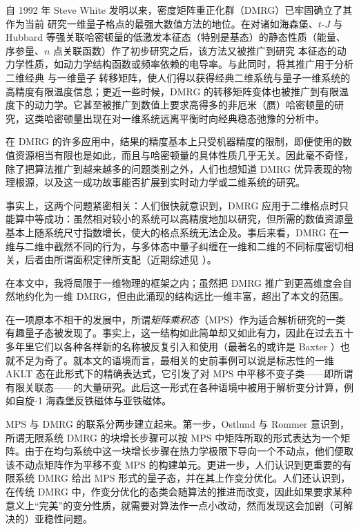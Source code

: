 \documentclass[a4paper,10pt,oneside,onecolumn,1p,times]{elsarticle}
\begin{document}
自 1992 年 Steve White 发明以来\cite{White92,White93}，密度矩阵重正化群（DMRG）已牢固确立了其作为当前
研究一维量子格点的最强大数值方法的地位\cite{Schollwoeck05,Hallberg06}。在对诸如海森堡、$t$-$J$ 与 Hubbard 等强关联哈密顿量的低激发本征态（特别是基态）的静态性质（能量、序参量、$n$ 点关联函数）作了初步研究之后，该方法又被推广到研究
本征态的动力学性质，如动力学结构函数或频率依赖的电导率\cite{Hallberg95,Ramasesha97,Kuhner99,Jeckelmann02}。与此同时，将其推广用于分析二维经典 \cite{Nishino95} 与一维量子 \cite{Wang97,Shibata97} 转移矩阵，使人们得以获得经典二维系统与量子一维系统的高精度有限温度信息；更近一些时候，DMRG 的转移矩阵变体也被推广到有限温度下的动力学\cite{Sirker05}。它甚至被推广到数值上要求高得多的非厄米（赝）哈密顿量的研究，这类哈密顿量出现在对一维系统远离平衡时向经典稳态弛豫的分析中\cite{Hieida98,Carlon99,Carlon01,Henkel01}。 

在 DMRG 的许多应用中，结果的精度基本上只受机器精度的限制，即便使用的数值资源相当有限也是如此，而且与哈密顿量的具体性质几乎无关。因此毫不奇怪，除了把算法推广到越来越多的问题类别之外，人们也想知道 DMRG 优异表现的物理根源，以及这一成功故事能否扩展到实时动力学或二维系统的研究。 

事实上，这两个问题紧密相关：人们很快就意识到，DMRG 应用于二维格点时只能算中等成功：虽然相对较小的系统可以高精度地加以研究\cite{White96,White98a,White98b,White00,White03,Chernyshev03,Chernyshev05,White07}，但所需的数值资源量基本上随系统尺寸指数增长，使大的格点系统无法企及。事后来看，DMRG 在一维与二维中截然不同的行为，与多体态中量子纠缠在一维和二维的不同标度密切相关\cite{Vidal03,Latorre04}，后者由所谓面积定律所支配（近期综述见 \cite{Eisert10}）。 

在本文中，我将局限于一维物理的框架之内；虽然把 DMRG 推广到更高维度会自然地约化为一维 DMRG，但由此涌现的结构远比一维丰富，超出了本文的范围。  
  
在一项原本不相干的发展中，所谓{\em 矩阵乘积态}（MPS）作为适合解析研究的一类有趣量子态被发现了。事实上，这一结构如此简单却又如此有力，因此在过去五十多年里它们以各种各样新的名称被反复引入和使用（最著名的或许是 Baxter \cite{Baxter68}）也就不足为奇了。就本文的语境而言，最相关的史前事例可以说是标志性的一维 AKLT 态在此形式下的精确表达式\cite{Affleck87,Affleck88,Fannes89}，它引发了对 MPS 中平移不变子类——即所谓有限关联态\cite{Fannes92}——的大量研究。此后这一形式在各种语境中被用于解析变分计算，例如自旋-1 海森堡反铁磁体\cite{Klumper93,Kolezhuk96a,Kolezhuk96b,Kolezhuk98}与亚铁磁体\cite{Kolezhuk97,Kolezhuk99}。

MPS 与 DMRG 的联系分两步建立起来。第一步，Ostlund 与 Rommer \cite{Ostlund95} 意识到，所谓无限系统 DMRG 的块增长步骤可以按 MPS 中矩阵所取的形式表达为一个矩阵。由于在均匀系统中这一块增长步骤在热力学极限下导向一个不动点，他们便取该不动点矩阵作为平移不变 MPS 的构建单元。更进一步，人们认识到更重要的有限系统 DMRG 给出 MPS 形式的量子态，并在其上作变分优化\cite{Dukelsky98}。人们还认识到，在传统 DMRG 中，作变分优化的态类会随算法的推进而改变，因此如果要求某种意义上``完美''的变分性质，就需要对算法作一点小改动，然而发现这会加剧（可解决的）亚稳性问题\cite{Takasaki99,White05}。 
\end{document}
